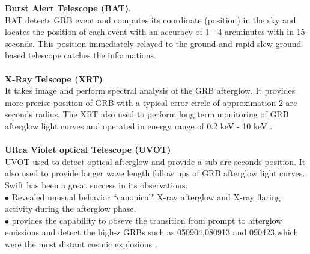 \textbf{Burst Alert Telescope (BAT)}.\\
BAT detects GRB event and computes its coordinate (position) in the sky and
locates the position of each event with an accuracy of 1 - 4 arcminutes with in 15
seconds. This position immediately relayed to the ground and rapid slew-ground
based telescope catches the informations.\\\\
\textbf{X-Ray Telscope (XRT)}\\
It takes image and perform spectral analysis of the GRB afterglow. It  provides
more precise position of GRB with a typical error circle of approximation 2 arc seconds radius. The XRT also used to perform long term monitoring of GRB afterglow light curves and operated in energy range of 0.2 keV - 10 keV .\\\\
\textbf{ Ultra Violet optical Telescope (UVOT)}\\
UVOT used to detect optical afterglow and provide a sub-arc seconds position. It
also used to provide longer wave length follow ups of GRB afterglow light curves.
 Swift has been a great success in its observations.\\
$\bullet$ Revealed unusual behavior  “canonical" X-ray afterglow  and  X-ray flaring activity during the afterglow phase.\\
$\bullet$ provides the capability to obseve the transition from prompt to afterglow emissions and  detect  the high-z GRBs such as 050904,080913 and 090423,which were the most distant cosmic explosions \citep {5} \citep{7}.\\\\

